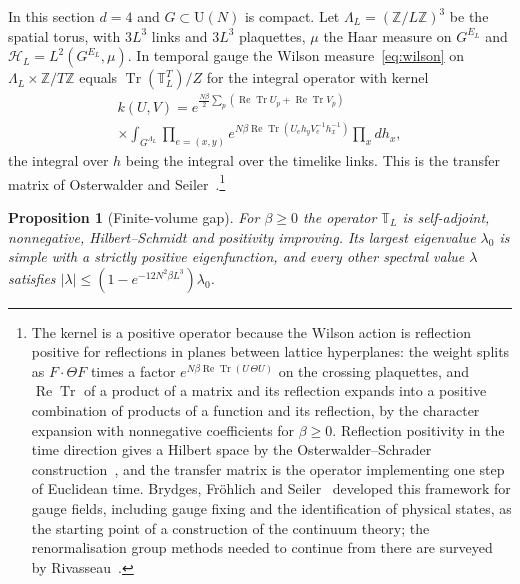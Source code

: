 \documentclass[aps,prd,twocolumn,superscriptaddress,nofootinbib,longbibliography,floatfix,amsmath,amssymb,10pt]{revtex4-2}
\newtheorem{proposition}[theorem]{Proposition}
\theoremstyle{definition}
\theoremstyle{remark}
\newcommand{\Z}{\mathbb{Z}}
\newcommand{\U}{\mathrm{U}}
\newcommand{\Tr}{\operatorname{Tr}}
\newcommand{\ReTr}{\operatorname{Re}\operatorname{Tr}}
\begin{document}
In this section $d=4$ and $G\subset\U(N)$ is compact. Let $\Lambda_L=
(\Z/L\Z)^3$ be the spatial torus, with $3L^3$ links and $3L^3$ plaquettes,
$\mu$ the Haar measure on $G^{E_L}$ and $\mathcal H_L=L^2(G^{E_L},\mu)$. In
temporal gauge the Wilson measure~\eqref{eq:wilson} on $\Lambda_L\times\Z/T\Z$
equals $\Tr(\mathbb T_L^T)/Z$ for the integral operator with kernel
\begin{multline*}
k(U,V)=e^{\frac{N\beta}2\sum_p(\ReTr U_p+\ReTr V_p)}\\
\times\int_{G^{\Lambda_L}}\prod_{e=(x,y)}e^{N\beta\ReTr(U_eh_yV_e^{-1}
h_x^{-1})}\prod_xdh_x ,
\end{multline*}
the integral over $h$ being the integral over the timelike links. This is
the transfer matrix of Osterwalder and Seiler~\cite{OSei78}.\footnote{The
kernel is a positive operator because the Wilson action is reflection
positive for reflections in planes between lattice hyperplanes: the weight
splits as $F\cdot\Theta F$ times a factor $e^{N\beta\ReTr(U\,\Theta U)}$ on
the crossing plaquettes, and $\ReTr$ of a product of a matrix and its
reflection expands into a positive combination of products of a function and
its reflection, by the character expansion with nonnegative coefficients for
$\beta\ge0$. Reflection positivity in the time direction gives a Hilbert
space by the Osterwalder--Schrader construction~\cite{OS73,OS75}, and the
transfer matrix is the operator implementing one step of Euclidean time.
Brydges, Fr\"ohlich and Seiler~\cite{BFS79} developed this framework for
gauge fields, including gauge fixing and the identification of physical
states, as the starting point of a construction of the continuum theory; the
renormalisation group methods needed to continue from there are surveyed by
Rivasseau~\cite{Riv91}.}

\begin{proposition}[Finite-volume gap]\label{prop:finitegap}
For $\beta\ge0$ the operator $\mathbb T_L$ is self-adjoint, nonnegative,
Hilbert--Schmidt and positivity improving. Its largest eigenvalue
$\lambda_0$ is simple with a strictly positive eigenfunction, and every other
spectral value $\lambda$ satisfies $|\lambda|\le(1-e^{-12N^2\beta L^3})
\lambda_0$.
\end{proposition}
\end{document}
